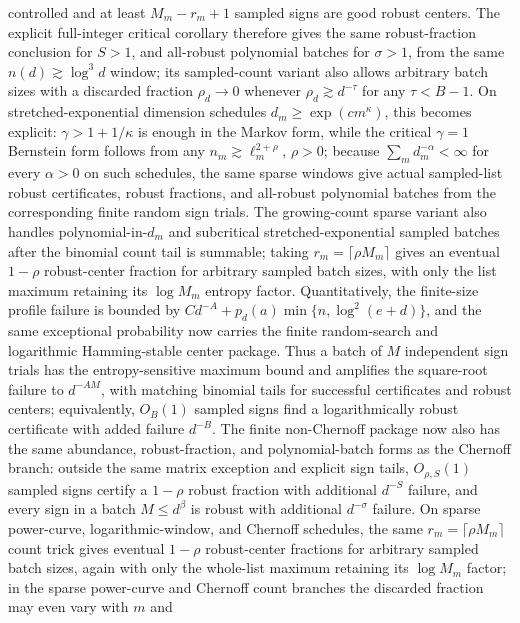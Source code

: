 \documentclass[11pt]{article}
\begin{document}
controlled and at least \(M_m-r_m+1\) sampled signs are good robust centers.  The
explicit full-integer critical corollary therefore
gives the same robust-fraction conclusion for \(S>1\), and all-robust polynomial
batches for \(\sigma>1\), from the same \(n(d)\gtrsim\log^3 d\) window; its
sampled-count variant also allows arbitrary batch sizes with a discarded
fraction \(\rho_d\to0\) whenever \(\rho_d\gtrsim d^{-\tau}\) for any
\(\tau<B-1\).  On stretched-exponential
dimension schedules \(d_m\ge\exp(c m^\kappa)\), this becomes explicit:
\(\gamma>1+1/\kappa\) is enough in the Markov form, while the critical
\(\gamma=1\) Bernstein form follows from any \(n_m\gtrsim\ell_m^{2+\rho}\),
\(\rho>0\); because \(\sum_m d_m^{-\alpha}<\infty\) for every \(\alpha>0\) on
such schedules, the same sparse windows give actual sampled-list robust
certificates, robust fractions, and all-robust polynomial batches from the
corresponding finite random sign trials.  The growing-count sparse variant also
handles polynomial-in-\(d_m\) and subcritical stretched-exponential sampled
batches after the binomial count tail is summable; taking
\(r_m=\lceil\rho M_m\rceil\) gives an eventual \(1-\rho\) robust-center fraction
for arbitrary sampled batch sizes, with only the list maximum retaining its
\(\log M_m\) entropy factor.  Quantitatively, the finite-size profile failure is
bounded by \(C d^{-A}+p_d(a)\min\{n,\log^2(e+d)\}\), and the same exceptional
probability now carries the finite random-search and logarithmic Hamming-stable
center package.  Thus a batch of \(M\) independent sign trials has the
entropy-sensitive maximum bound and amplifies the square-root failure to
\(d^{-AM}\), with matching binomial tails for successful certificates and robust
centers; equivalently, \(O_B(1)\) sampled signs find a logarithmically robust
certificate with added failure \(d^{-B}\).  The finite non-Chernoff package now
also has the same abundance, robust-fraction, and polynomial-batch forms as the
Chernoff branch: outside the same matrix exception and explicit sign tails,
\(O_{\rho,S}(1)\) sampled signs certify a \(1-\rho\) robust fraction with
additional \(d^{-S}\) failure, and every sign in a batch \(M\le d^\beta\) is
robust with additional \(d^{-\sigma}\) failure.  On sparse power-curve,
logarithmic-window, and Chernoff schedules, the same
\(r_m=\lceil\rho M_m\rceil\) count trick gives eventual \(1-\rho\)
robust-center fractions for arbitrary sampled batch sizes, again with only the
whole-list maximum retaining its \(\log M_m\) factor; in the sparse power-curve
and Chernoff count branches the discarded fraction may even vary with \(m\) and
\end{document}
